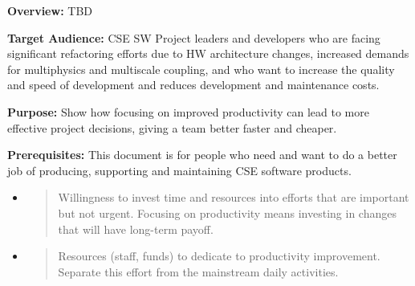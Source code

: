 \documentclass[]{article}
\date{}
\begin{document}
\pagestyle{fancy}
\renewcommand{\headrulewidth}{0pt}
  
\thispagestyle{empty}
\textbf{\newline}
\textbf{\newline}



\textbf{Overview:} TBD

\textbf{Target Audience:} CSE SW Project leaders and developers who are
facing significant refactoring efforts due to HW architecture changes,
increased demands for multiphysics and multiscale coupling, and who want
to increase the quality and speed of development and reduces development
and maintenance costs.

\textbf{Purpose:} Show how focusing on improved productivity can lead to
more effective project decisions, giving a team better faster and
cheaper.

\textbf{Prerequisites:} This document is for people who need and want to
do a better job of producing, supporting and maintaining CSE software
products.

\begin{itemize}
\item
  \begin{quote}
  Willingness to invest time and resources into efforts that are
  important but not urgent. Focusing on productivity means investing in
  changes that will have long-term payoff.
  \end{quote}
\item
  \begin{quote}
  Resources (staff, funds) to dedicate to productivity improvement.
  Separate this effort from the mainstream daily activities.
  \end{quote}
\end{itemize}
\end{document}
